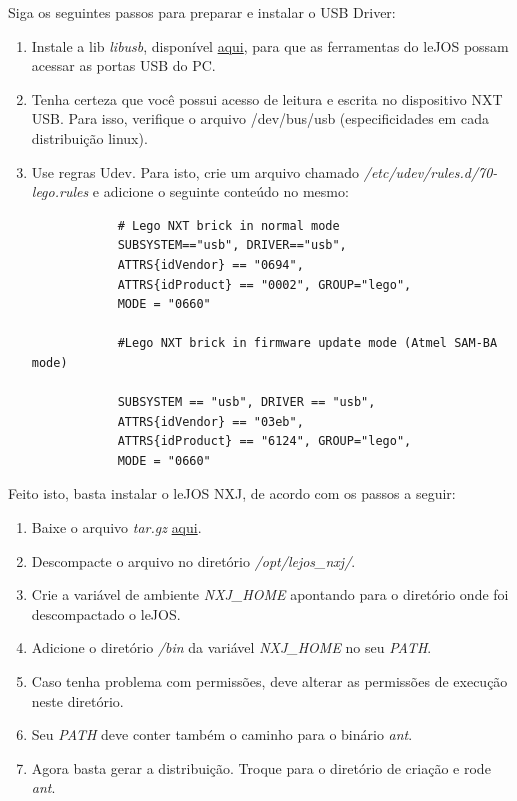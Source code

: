 	Siga os seguintes passos para preparar e instalar o USB Driver:

	\begin{enumerate}
		\item Instale a lib \textit{libusb}, disponível \href{http://libusb.sourceforge.net}{aqui}, para que as ferramentas do leJOS possam acessar as portas USB do PC.
		\item  Tenha certeza que você possui acesso de leitura e escrita no dispositivo NXT USB. Para isso, verifique o arquivo /dev/bus/usb (especificidades em cada distribuição linux).
		\item Use regras Udev. Para isto, crie um arquivo chamado \textit{/etc/udev/rules.d/70-lego.rules} e adicione o seguinte conteúdo no mesmo:

		\begin{lstlisting}
			# Lego NXT brick in normal mode
			SUBSYSTEM=="usb", DRIVER=="usb",
			ATTRS{idVendor} == "0694",
			ATTRS{idProduct} == "0002", GROUP="lego",
			MODE = "0660"

			#Lego NXT brick in firmware update mode (Atmel SAM-BA mode)

			SUBSYSTEM == "usb", DRIVER == "usb",
			ATTRS{idVendor} == "03eb",
			ATTRS{idProduct} == "6124", GROUP="lego",
			MODE = "0660"
		\end{lstlisting}
	\end{enumerate}

	Feito isto, basta instalar o leJOS NXJ, de acordo com os passos a seguir:

	\begin{enumerate}
		\item Baixe o arquivo \textit{tar.gz} \href{www.lejos.org}{aqui}.
		\item Descompacte o arquivo no diretório \textit{/opt/lejos\_nxj/}.
		\item Crie a variável de ambiente \textit{NXJ\_HOME} apontando para o diretório onde foi descompactado o leJOS.
		\item Adicione o diretório \textit{/bin} da variável \textit{NXJ\_HOME} no seu \textit{PATH}.
		\item Caso tenha problema com permissões, deve alterar as permissões de execução neste diretório.
		\item Seu \textit{PATH} deve conter também o caminho para o binário \textit{ant}.
		\item Agora basta gerar a distribuição. Troque para o diretório de criação e rode \textit{ant}.
	\end{enumerate}

